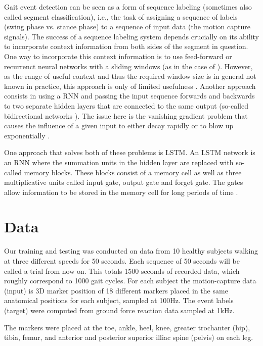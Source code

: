\documentclass{acm_proc_article-sp}
\begin{document}
Gait event detection can be seen as a form of sequence labeling (sometimes also
called segment classification), i.e., the task of assigning a sequence of labels
(swing phase vs. stance phase) to a sequence of input data (the motion capture
signals).
The success of a sequence labeling system depends crucially on its ability to
incorporate context information from both sides of the segment in question.
%
One way to incorporate this context information is to use feed-forward or
recurrenct neural networks with a sliding windows (as in the case of
\cite{Miller2009}).
However, as the range of useful context and thus the required window size is in
general not known in practice, this approach is only of limited usefulness
\cite{Graves2012}.
%
Another approach consists in using a RNN and passing the
input sequence forwards and backwards to two separate hidden layers that are
connected to the same output (so-called bidirectional networks
\cite{Schuster1999}).
The issue here is the vanishing gradient problem that causes the influence of a
given input to either decay rapidly or to blow up exponentially
\cite{Hochreiter1991}.

One approach that solves both of these problems is LSTM.
An LSTM network is an RNN where the summation units in the hidden layer are 
replaced with so-called memory blocks.
These blocks consist of a memory cell as well as three multiplicative units 
called input gate, output gate and forget gate.
The gates allow information to be stored in the memory cell for long periods 
of time
\cite{Graves2012}.


\section{Data}
\label{sec:Data}
Our training and testing was conducted on data from 10 healthy subjects walking at three different speeds for 50 seconds. Each sequence of 50 seconds will be called a trial from now on. This totals 1500 seconds of recorded data, which roughly correspond to 1000 gait cycles.  For each subject the motion-capture data (input) is 3D marker position of 18 different markers placed in the same anatomical positions for each subject, sampled at 100Hz. The event labels (target) were computed from ground force reaction data sampled at 1kHz.

The markers were placed at the toe, ankle, heel, knee, greater trochanter (hip), tibia, femur, and anterior and posterior superior illiac spine (pelvis) on each leg.
\end{document}
